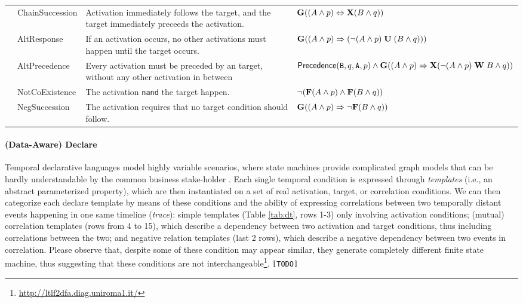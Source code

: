 \begin{table}
{\begin{tabular}{c|l|p{9cm}|l}
	 & \textsf{ChainSuccession}  & Activation immediately follows the target, and the target immediately preceeds the activation. & $\mathbf{G}((A\wedge p)\Leftrightarrow\mathbf{X}(B\wedge q))$\\
	 & \textsf{AltResponse}  & If an activation occurs, no other activations must happen until the target occurs.  & $\mathbf{G}((A\wedge p)\Rightarrow({\neg(A\wedge p)}\;\mathbf{U}\;{(B\wedge q)}))$\\
	 & \textsf{AltPrecedence}  & Every activation must be preceded by an target, without any other
	 activation in between &   $\textsf{Precedence}(\texttt{B},q,\texttt{A},p)\wedge \mathbf{G}((A\wedge p)\Rightarrow \mathbf{X}({\neg(A\wedge p)}\;\mathbf{W}\;{B\wedge q}))$\\
	 \midrule
	 
	 \parbox[t]{2mm}{} & \textsf{NotCoExistence} & The activation \texttt{nand} the target happen.&  $\neg(\mathbf{F}(A\wedge p)\wedge\mathbf{F}(B\wedge q))$\\
	 & \textsf{NegSuccession} & The activation requires that no target condition should follow.& $\mathbf{G}((A\wedge p)\Rightarrow \neg\mathbf{F}(B\wedge q))$ \\
	 \bottomrule
\end{tabular}}
\end{table}



\paragraph*{(Data-Aware) Declare} Temporal declarative languages model highly variable scenarios, where state machines provide complicated graph models that can be hardly understandable by the common business stake-holder \cite{PichlerWZPMR11}. Each single temporal condition is expressed through \textit{templates} (i.e., an abstract parameterized property), which are then instantiated on a set of real activation, target, or correlation conditions. We can then categorize each declare template by means of these conditions and the ability of expressing correlations between two temporally distant events happening in one same timeline (\textit{trace}): simple
 templates (Table \ref{tab:dt}, rows 1-3) only involving activation conditions; (mutual)
 correlation templates (rows from 4 to 15), which describe a dependency between two
activation and target conditions, thus including correlations between the two; and negative relation templates (last 2 rows), which describe a negative
dependency between two events in correlation. Please observe that, despite some of these condition may appear similar, they generate completely different finite state machine, thus suggesting that these conditions are not interchangeable\footnote{\url{http://ltlf2dfa.diag.uniroma1.it/}}. \texttt{\color{red}[TODO]}

